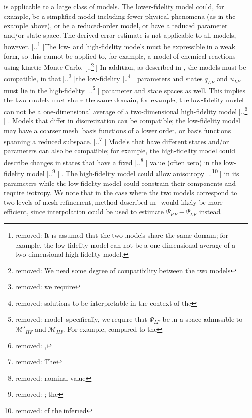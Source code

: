 \documentclass[review,sort&compress]{elsarticle}
\providecommand{\DIFaddtex}[1]{{\protect\color{blue} \sf #1}} %
\providecommand{\DIFdeltex}[1]{{\protect\color{red} [..\footnote{removed: #1} ]}} %
\providecommand{\DIFaddbegin}{} %
\providecommand{\DIFaddend}{} %
\providecommand{\DIFdelbegin}{} %
\providecommand{\DIFdelend}{} %
\providecommand{\DIFadd}[1]{\texorpdfstring{\DIFaddtex{#1}}{#1}} %
\providecommand{\DIFdel}[1]{\texorpdfstring{\DIFdeltex{#1}}{}} %
\newcommand{\DIFscaledelfig}{0.5}
\newlength{\DIFdelgraphicswidth} %
\newlength{\DIFdelgraphicsheight} %
\newcommand{\DIFaddincludegraphics}[2][]{{\color{blue}\fbox{\DIFOincludegraphics[#1]{#2}}}} %
\newcommand{\DIFdelincludegraphics}[2][]{%
\sbox{\DIFdelgraphicsbox}{\DIFOincludegraphics[#1]{#2}}%
\settoboxwidth{\DIFdelgraphicswidth}{\DIFdelgraphicsbox} %
\settoboxtotalheight{\DIFdelgraphicsheight}{\DIFdelgraphicsbox} %
\scalebox{\DIFscaledelfig}{%
\parbox[b]{\DIFdelgraphicswidth}{\usebox{\DIFdelgraphicsbox}\\[-\baselineskip] \rule{\DIFdelgraphicswidth}{0em}}\llap{\resizebox{\DIFdelgraphicswidth}{\DIFdelgraphicsheight}{%
\setlength{\unitlength}{\DIFdelgraphicswidth}%
\begin{picture}(1,1)%
\thicklines\linethickness{2pt} %
{\color[rgb]{1,0,0}\put(0,0){\framebox(1,1){}}}%
{\color[rgb]{1,0,0}\put(0,0){\line( 1,1){1}}}%
{\color[rgb]{1,0,0}\put(0,1){\line(1,-1){1}}}%
\end{picture}%
}\hspace*{3pt}}} %
} %
\DeclareRobustCommand{\DIFaddbegin}{\DIFOaddbegin \let\includegraphics\DIFaddincludegraphics} %
\DeclareRobustCommand{\DIFaddend}{\DIFOaddend \let\includegraphics\DIFOincludegraphics} %
\DeclareRobustCommand{\DIFdelbegin}{\DIFOdelbegin \let\includegraphics\DIFdelincludegraphics} %
\DeclareRobustCommand{\DIFdelend}{\DIFOaddend \let\includegraphics\DIFOincludegraphics} %
\begin{document}
 is applicable to a large class of models. The lower-fidelity model could, for example, be a simplified model including fewer physical phenomena (as in the example above), or be a reduced-order model, or have a reduced parameter and/or state space. The derived error estimate is not applicable to all models, however. \DIFdelbegin \DIFdel{It is assumed that the two models share the same domain; for example, the low-fidelity model can not be a one-dimensional average of a two-dimensional high-fidelity model. }\DIFdelend The low- and high-fidelity models must be expressible in a weak form, so this cannot be applied to, for example, a model of chemical reactions using kinetic Monte Carlo. \DIFdelbegin \DIFdel{We need some degree of compatibility between the two models }\DIFdelend \DIFaddbegin \DIFadd{In addition, as described in , the models must be compatible}\DIFaddend , in that \DIFdelbegin \DIFdel{we require }\DIFdelend the low-fidelity \DIFdelbegin \DIFdel{solutions to be interpretable in the context of the }\DIFdelend \DIFaddbegin \DIFadd{parameters and states $q_{LF}$ and $u_{LF}$ must lie in the }\DIFaddend high-fidelity \DIFdelbegin \DIFdel{model; specifically, we require that $\Psi_{LF}$ be in a space admissible to $\mathcal{M}'_{HF}$ and $\mathcal{M}_{HF}$. For example, compared to the }\DIFdelend \DIFaddbegin \DIFadd{parameter and state spaces as well. This implies the two models must share the same domain; for example, the low-fidelity model can not be a one-dimensional average of a two-dimensional }\DIFaddend high-fidelity model\DIFdelbegin \DIFdel{, }\DIFdelend \DIFaddbegin \DIFadd{. Models that differ in discretization can be compatible; }\DIFaddend the low-fidelity model may have a coarser mesh, basis functions of a lower order, or basis functions spanning a reduced subspace. \DIFdelbegin \DIFdel{The }\DIFdelend \DIFaddbegin \DIFadd{Models that have different states and/or parameters can also be compatible; for example, the }\DIFaddend high-fidelity model could describe changes in states that have a fixed \DIFdelbegin \DIFdel{nominal value }\DIFdelend \DIFaddbegin \DIFadd{value (often zero) }\DIFaddend in the low-fidelity model\DIFdelbegin \DIFdel{; the }\DIFdelend \DIFaddbegin \DIFadd{. The }\DIFaddend high-fidelity model could allow anisotropy \DIFdelbegin \DIFdel{of the inferred }\DIFdelend \DIFaddbegin \DIFadd{in its }\DIFaddend parameters while the low-fidelity model could constrain their components and require isotropy. We note that in the case where the two models correspond to two levels of mesh refinement, method described in~\cite{BecVex05} would likely be more efficient, since interpolation could be used to estimate $\Psi_{HF}-\Psi_{LF}$ instead.
\end{document}

